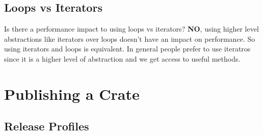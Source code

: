 \subsection{Loops vs Iterators}

Is there a performance impact to using loops vs iterators? \textbf{NO}, using higher level abstractions like iterators over loops doesn't have an impact on performance. So using iterators and loops is equivalent.
In general people prefer to use iteratros since it is a higher level of abstraction and we get access to useful methods.

\section{Publishing a Crate}
\subsection{Release Profiles}

